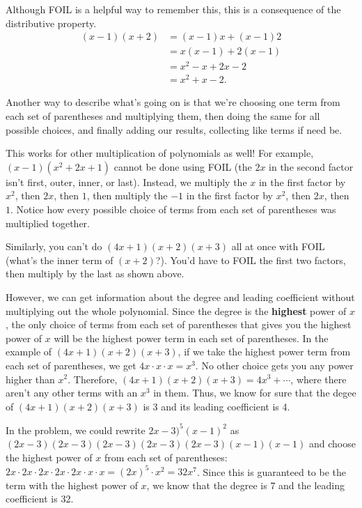 \documentclass[noauthor]{ximera}
\begin{document}
\begin{problem}
\begin{explanation}
\begin{enumerate}
\begin{enumerate}
        Although FOIL is a helpful way to remember this, this is a consequence of the distributive property.
        \begin{align*}
            (x - 1)(x + 2) & = (x - 1)x + (x - 1)2 \\
            & = x(x - 1) + 2(x - 1) \\
            & = x^2 - x + 2x - 2 \\
            & = x^2 + x - 2. 
        \end{align*}
        
        Another way to describe what's going on is that we're choosing one term from each set of parentheses and multiplying them, then doing the same for all possible
        choices, and finally adding our results, collecting like terms if need be.

        This works for other multiplication of polynomials as well! For example, \((x - 1)(x^2 + 2x + 1)\) cannot be done using FOIL (the \(2x\) in the second factor 
        isn't first, outer, inner, or last). Instead, we multiply the \(x\) in the first factor by \(x^2\), then \(2x\), then \(1\), then multiply the \(-1\) in the
        first factor by \(x^2\), then \(2x\), then \(1\). Notice how every possible choice of terms from each set of parentheses was multiplied together.

        Similarly, you can't do \((4x + 1)(x + 2)(x + 3)\) all at once with FOIL (what's the inner term of \((x + 2)\)?). You'd have to FOIL the first two factors, then 
        multiply by the last as shown above. 

        However, we can get information about the degree and leading coefficient without multiplying out the whole polynomial. Since the degree is the \textbf{highest}
        power of \(x\), the only choice of terms from each set of parentheses that gives you the highest power of \(x\) will be the highest power term in each set
        of parentheses. In the example of \((4x + 1)(x + 2)(x + 3)\), if we take the highest power term from each set of parentheses, we get \(4x \cdot x \cdot x = x^3\).
        No other choice gets you any power higher than \(x^2\). Therefore, \((4x + 1)(x + 2)(x + 3) = 4x^3 + \cdots\), where there aren't any other terms with an \(x^3\)
        in them. Thus, we know for sure that the degee of \((4x + 1)(x + 2)(x + 3)\) is 3 and its leading coefficient is 4.

        In the problem, we could rewrite \(2x - 3)^5(x - 1)^2\) as \((2x - 3)(2x - 3)(2x - 3)(2x - 3)(2x - 3)(x - 1)(x - 1)\) and choose the highest power 
        of \(x\) from each set of parentheses: \(2x \cdot 2x \cdot 2x \cdot 2x \cdot 2x \cdot x \cdot x = (2x)^5\cdot x^2 = 32x^7\). Since this is guaranteed
        to be the term with the highest power of \(x\), we know that the degree is 7 and the leading coefficient is 32.


\end{enumerate}
\end{enumerate}
\end{explanation}
\end{problem}
\end{document}
